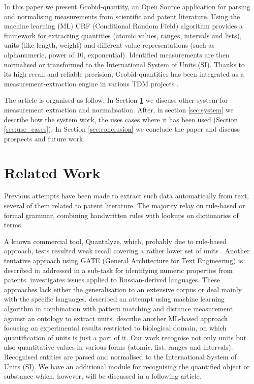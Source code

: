 \documentclass[sigconf]{acmart}
\begin{document}
In this paper we present Grobid-quantity, an Open Source application \cite{grobid-quantities} for parsing and normalising measurements from scientific and patent literature. Using the machine learning (ML) CRF (Conditional Random Field) algorithm provides a framework for extracting quantities (atomic values, ranges, intervals and lists), units (like length, weight) and different value representations (such as alphanumeric, power of 10, exponential). Identified measurements are then normalised or transformed to the International System of Units (SI). Thanks to its high recall and reliable precision, Grobid-quantities has been integrated as a measurement-extraction engine in various TDM projects \cite{foppiano2019proposal}.

The article is organised as follow. In Section \ref{sec:related_work} we discuss other system for measurement extraction and normalisation. After, in section \ref{sec:system} we describe how the system work, the uses cases where it has been used (Section \ref{sec:use_cases}). In Section \ref{sec:conclusion} we conclude the paper and discuss prospects and future work. 

\section{Related Work}
\label{sec:related_work}
Previous attempts have been made to extract such data automatically from text, several of them related to patent literature. The majority relay on rule-based or formal grammar, combining handwritten rules with lookups on dictionaries of terms.  

A known commercial tool, Quantalyze, which, probably due to rule-based approach, tests resulted weak recall \cite{hundman2017measurement} covering a rather lower set of units \cite{aras2014applications}. Another tentative approach using GATE (General Architecture for Text Engineering) is described in \cite{agatonovic2008large} addressed in a sub-task for identifying numeric properties from patents. \cite{am2013processing} investigates issues applied to Russian-derived languages. These approaches lack either the generalisation to an extensive corpus or deal mainly with the specific languages. \cite{berrahou2013extract} described an attempt using machine learning algorithm in combination with pattern matching and distance measurement against an ontology to extract units. \cite{kang_extracting_2013} describe another ML-based approach focusing on experimental results restricted to biological domain, on which quantification of units is just a part of it. 
Our work recognise not only units but also quantitative values in various forms (atomic, list, ranges and intervals). Recognised entities are parsed and normalised to the International System of Units (SI). We have an additional module for recognising the quantified object or substance which, however, will be discussed in a following article.
\end{document}
